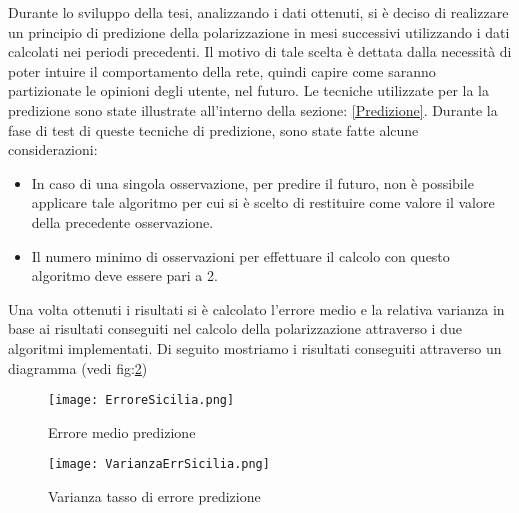 Durante lo sviluppo della tesi, analizzando i dati ottenuti, si è deciso di realizzare un principio di predizione della polarizzazione in mesi successivi utilizzando i dati calcolati nei periodi precedenti. Il motivo di tale scelta è dettata dalla necessità di poter intuire il comportamento della rete, quindi capire come saranno partizionate le opinioni degli utente, nel futuro. Le tecniche utilizzate per la la predizione sono state illustrate all'interno della sezione: \ref{Predizione}.
Durante la fase di test di queste tecniche di predizione, sono state fatte alcune considerazioni:
\begin{itemize}
\item In caso di una singola osservazione, per predire il futuro, non è possibile applicare tale algoritmo per cui si è scelto di restituire come valore il valore della precedente  osservazione.
\item Il numero minimo di osservazioni per effettuare il calcolo con questo algoritmo deve essere pari a 2.
\end{itemize}
Una volta ottenuti i risultati si è calcolato l'errore medio e la relativa varianza in base ai risultati conseguiti nel calcolo della polarizzazione attraverso i due algoritmi implementati. Di seguito mostriamo i risultati conseguiti attraverso un diagramma (vedi fig:\ref{predizioneSicilia1})
\begin{figure}[!ht]
\centering
\texttt{[image: ErroreSicilia.png]}
\caption{Errore medio predizione}
\label{predizioneSicilia1}
\end{figure}
\begin{figure}[!ht]
\centering
\texttt{[image: VarianzaErrSicilia.png]}
\caption{Varianza tasso di errore predizione}
\label{predizioneSicilia1}
\end{figure}

\newpage
